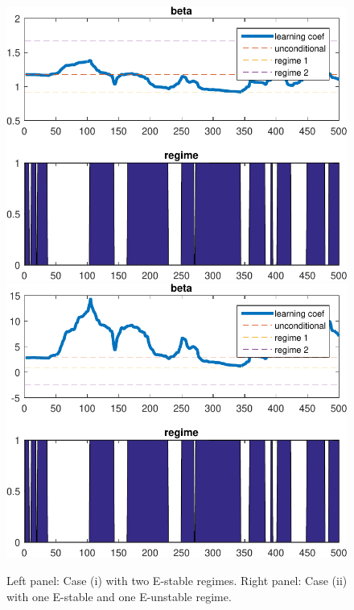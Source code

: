 \documentclass[12pt,reqno]{article}
\numberwithin{equation}{section}
\begin{document}
\begin{figure}[H]
\caption{Left panel: Case (i) with two E-stable regimes. Right panel: Case (ii) with one E-stable and one E-unstable regime. }
\includegraphics[scale=0.6]{fisher_simulation1_learningCoef.pdf} 
\includegraphics[scale=0.6]{fisher_simulation2_learningCoef.pdf} \\

\end{figure}
\end{document}
